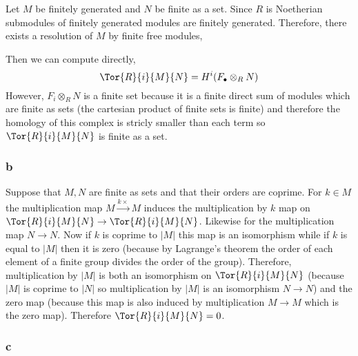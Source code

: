 \documentclass[12pt]{article}
\begin{document}
Let $M$ be finitely generated and $N$ be finite as a set. Since $R$ is Noetherian submodules of finitely generated modules are finitely generated. Therefore, there exists a resolution of $M$ by finite free modules,
\begin{center}
\end{center}
Then we can compute directly,
\[ \Tor{R}{i}{M}{N} = H^i(F_\bullet \otimes_R N) \]
However, $F_i \otimes_R N$ is a finite set because it is a finite direct sum of modules which are finite as sets (the cartesian product of finite sets is finite) and therefore the homology of this complex is stricly smaller than each term so $\Tor{R}{i}{M}{N}$ is finite as a set.

\subsubsection{b}

Suppose that $M,N$ are finite as sets and that their orders are coprime. For $k \in M$ the multiplication map $M \xrightarrow{k \times} M$ induces the multiplication by $k$ map on $\Tor{R}{i}{M}{N} \to \Tor{R}{i}{M}{N}$. Likewise for the multiplication map $N \to N$. Now if $k$ is coprime to $|M|$ this map is an isomorphism while if $k$ is equal to $|M|$ then it is zero (because by Lagrange's theorem the order of each element of a finite group divides the order of the group). Therefore, multiplication by $|M|$ is both an isomorphism on $\Tor{R}{i}{M}{N}$ (because $|M|$ is coprime to $|N|$ so multiplication by $|M|$ is an isomorphism $N \to N$) and the zero map (because this map is also induced by multiplication $M \to M$ which is the zero map). Therefore $\Tor{R}{i}{M}{N} = 0$.

\subsubsection{c}
\end{document}
